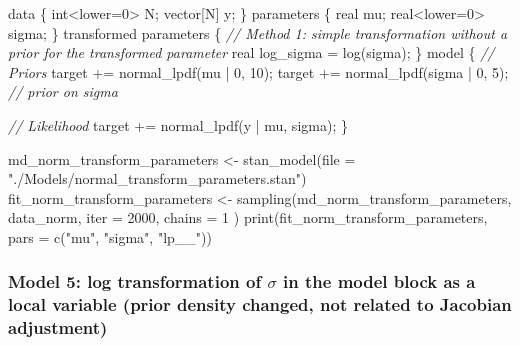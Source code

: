 \documentclass[
  letterpaper,
  DIV=11,
  numbers=noendperiod]{scrartcl}
\newenvironment{Shaded}{}{}
\newcommand{\AttributeTok}[1]{\textcolor[rgb]{0.65,0.15,0.64}{#1}}
\newcommand{\CommentTok}[1]{\textcolor[rgb]{0.63,0.63,0.65}{\textit{#1}}}
\newcommand{\DataTypeTok}[1]{\textcolor[rgb]{0.65,0.15,0.64}{#1}}
\newcommand{\DecValTok}[1]{\textcolor[rgb]{0.60,0.41,0.00}{#1}}
\newcommand{\FunctionTok}[1]{\textcolor[rgb]{0.25,0.47,0.95}{#1}}
\newcommand{\KeywordTok}[1]{\textcolor[rgb]{0.65,0.15,0.64}{#1}}
\newcommand{\NormalTok}[1]{\textcolor[rgb]{0.22,0.23,0.26}{#1}}
\newcommand{\OtherTok}[1]{\textcolor[rgb]{0.15,0.68,0.38}{#1}}
\newcommand{\StringTok}[1]{\textcolor[rgb]{0.31,0.63,0.31}{#1}}
\begin{document}
\begin{Shaded}
\begin{Highlighting}[]
\KeywordTok{data}\NormalTok{ \{}
  \DataTypeTok{int}\NormalTok{\textless{}}\KeywordTok{lower}\NormalTok{=}\DecValTok{0}\NormalTok{\textgreater{} N;}
  \DataTypeTok{vector}\NormalTok{[N] y;}
\NormalTok{\}}
\KeywordTok{parameters}\NormalTok{ \{}
  \DataTypeTok{real}\NormalTok{ mu;}
  \DataTypeTok{real}\NormalTok{\textless{}}\KeywordTok{lower}\NormalTok{=}\DecValTok{0}\NormalTok{\textgreater{} sigma;}
\NormalTok{\} }
\KeywordTok{transformed parameters}\NormalTok{ \{}
  \CommentTok{// Method 1: simple transformation without a prior for the transformed parameter}
  \DataTypeTok{real}\NormalTok{ log\_sigma = log(sigma); }
\NormalTok{\}}
\KeywordTok{model}\NormalTok{ \{}
  \CommentTok{// Priors}
  \KeywordTok{target +=}\NormalTok{ normal\_lpdf(mu | }\DecValTok{0}\NormalTok{, }\DecValTok{10}\NormalTok{);}
  \KeywordTok{target +=}\NormalTok{ normal\_lpdf(sigma | }\DecValTok{0}\NormalTok{, }\DecValTok{5}\NormalTok{); }\CommentTok{// prior on sigma}

  \CommentTok{// Likelihood}
  \KeywordTok{target +=}\NormalTok{ normal\_lpdf(y | mu, sigma);}
\NormalTok{\}}
\end{Highlighting}
\end{Shaded}

\begin{Shaded}
\begin{Highlighting}[]
\NormalTok{md\_norm\_transform\_parameters }\OtherTok{\textless{}{-}} \FunctionTok{stan\_model}\NormalTok{(}\AttributeTok{file =} \StringTok{"./Models/normal\_transform\_parameters.stan"}\NormalTok{)}
\NormalTok{fit\_norm\_transform\_parameters }\OtherTok{\textless{}{-}} \FunctionTok{sampling}\NormalTok{(md\_norm\_transform\_parameters, data\_norm,}
  \AttributeTok{iter =} \DecValTok{2000}\NormalTok{, }\AttributeTok{chains =} \DecValTok{1}
\NormalTok{)}
\FunctionTok{print}\NormalTok{(fit\_norm\_transform\_parameters, }\AttributeTok{pars =} \FunctionTok{c}\NormalTok{(}\StringTok{"mu"}\NormalTok{, }\StringTok{"sigma"}\NormalTok{, }\StringTok{"lp\_\_"}\NormalTok{))}
\end{Highlighting}
\end{Shaded}

\subsubsection{\texorpdfstring{Model 5: log transformation of \(\sigma\)
in the model block as a local variable (prior density changed, not
related to Jacobian
adjustment)}{Model 5: log transformation of \textbackslash sigma in the model block as a local variable (prior density changed, not related to Jacobian adjustment)}}\label{model-5-log-transformation-of-sigma-in-the-model-block-as-a-local-variable-prior-density-changed-not-related-to-jacobian-adjustment}
\end{document}
